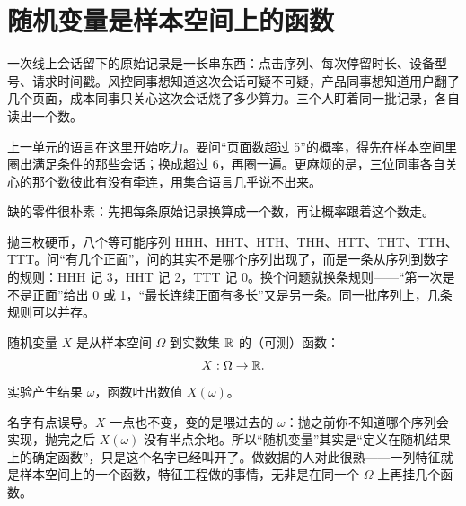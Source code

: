 \section{随机变量是样本空间上的函数}
\label{sec:05-Probability/03-Random-Variables/01}

一次线上会话留下的原始记录是一长串东西：点击序列、每次停留时长、设备型号、请求时间戳。风控同事想知道这次会话可疑不可疑，产品同事想知道用户翻了几个页面，成本同事只关心这次会话烧了多少算力。三个人盯着同一批记录，各自读出一个数。

上一单元的语言在这里开始吃力。要问``页面数超过 5''的概率，得先在样本空间里圈出满足条件的那些会话；换成超过 6，再圈一遍。更麻烦的是，三位同事各自关心的那个数彼此有没有牵连，用集合语言几乎说不出来。

缺的零件很朴素：先把每条原始记录换算成一个数，再让概率跟着这个数走。

抛三枚硬币，八个等可能序列 HHH、HHT、HTH、THH、HTT、THT、TTH、TTT。问``有几个正面''，问的其实不是哪个序列出现了，而是一条从序列到数字的规则：HHH 记 3，HHT 记 2，TTT 记 0。换个问题就换条规则——``第一次是不是正面''给出 0 或 1，``最长连续正面有多长''又是另一条。同一批序列上，几条规则可以并存。

\begin{definition}
随机变量 \(X\) 是从样本空间 \(\Omega\) 到实数集 \(\mathbb{R}\) 的（可测）函数：
\[
X:\Omega\to\mathbb{R}.
\]
实验产生结果 \(\omega\)，函数吐出数值 \(X(\omega)\)。
\end{definition}

名字有点误导。\(X\) 一点也不变，变的是喂进去的 \(\omega\)：抛之前你不知道哪个序列会实现，抛完之后 \(X(\omega)\) 没有半点余地。所以``随机变量''其实是``定义在随机结果上的确定函数''，只是这个名字已经叫开了。做数据的人对此很熟——一列特征就是样本空间上的一个函数，特征工程做的事情，无非是在同一个 \(\Omega\) 上再挂几个函数。

